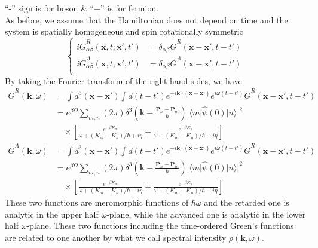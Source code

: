  ``-'' sign is for boson \& ``+'' is for fermion.\\
As before, we assume that the Hamiltonian does not depend on time and the system is spatially homogeneous and spin rotationally symmetric
\[
\left\{
\begin{aligned}
i\bar G ^R_{\alpha\beta}(\mathbf{x},t;\mathbf{x}',t')&=\delta_{\alpha\beta} \bar G^R (\mathbf{x}-\mathbf{x}',t-t')\\
i\bar G ^A_{\alpha\beta}(\mathbf{x},t;\mathbf{x}',t')&=\delta_{\alpha\beta} \bar G^A (\mathbf{x}-\mathbf{x}',t-t')\\
\end{aligned}
\right.
\]
By taking the Fourier transform of the right hand sides, we have
\begin{equation}
\begin{aligned}
\bar G^R(\mathbf{k},\omega)&=\int d^3(\mathbf{x}-\mathbf{x}') \int d(t-t') e^{-i\mathbf{k} \cdot (\mathbf{x}-\mathbf{x}')} e^{i\omega(t-t')} \bar G^R (\mathbf{x}-\mathbf{x}',t-t')\\
&=e^{\beta\Omega} \sum_{m,n} (2\pi) \delta^3 (\mathbf{k}-\frac{\mathbf{P}_n-\mathbf{P}_m}{\hbar})  |\langle m|\hat{\psi}(0) |n\rangle |^2\\
&\quad \times \left[ \frac{e^{-\beta K_m}}{\omega+(K_m-K_n)/\hbar +i\eta} \mp \frac{e^{-\beta K_n}}{\omega+(K_m-K_n)/\hbar +i\eta} \right]
\end{aligned}
\end{equation}
\begin{equation}
\begin{aligned}
\bar G^A(\mathbf{k},\omega)&=\int d^3(\mathbf{x}-\mathbf{x}') \int d(t-t') e^{-i\mathbf{k} \cdot (\mathbf{x}-\mathbf{x}')} e^{i\omega(t-t')} \bar G^R (\mathbf{x}-\mathbf{x}',t-t')\\
&=e^{\beta\Omega} \sum_{m,n} (2\pi) \delta^3 (\mathbf{k}-\frac{\mathbf{P}_n-\mathbf{P}_m}{\hbar})  |\langle m|\hat{\psi}(0) |n\rangle |^2\\
&\quad \times \left[ \frac{e^{-\beta K_m}}{\omega+(K_m-K_n)/\hbar -i\eta} \mp \frac{e^{-\beta K_n}}{\omega+(K_m-K_n)/\hbar -i\eta} \right]
\end{aligned}
\end{equation}
 These two functions are meromorphic functions of $\hbar\omega$ and the retarded one is analytic in the upper half $\omega$-plane, while the advanced one is analytic in the lower half $\omega$-plane.
 These two functions including the time-ordered Green's functions are related to one another by what we call spectral intensity $\rho(\mathbf{k},\omega)$.
